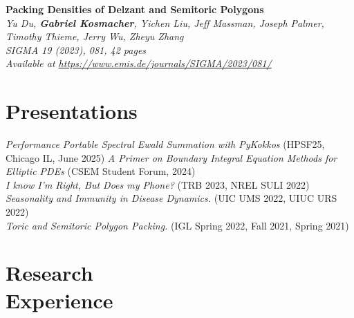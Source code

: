 \documentclass[resmargin, 10pt]{res} %
\begin{document}
\begin{resume}
\textbf{Packing Densities of Delzant and Semitoric Polygons} \\
\sl{Yu Du, \textbf{Gabriel Kosmacher}, Yichen Liu, Jeff Massman, Joseph Palmer, Timothy Thieme, Jerry Wu, Zheyu Zhang} \\
SIGMA 19 (2023), 081, 42 pages \\ Available at \href{https://www.emis.de/journals/SIGMA/2023/081/}{https://www.emis.de/journals/SIGMA/2023/081/}


\vspace{-8pt}
\section{Presentations} 

{\sl Performance Portable Spectral Ewald Summation with PyKokkos} (HPSF25, Chicago IL, June 2025)
{\sl A Primer on Boundary Integral Equation Methods for Elliptic PDEs} (CSEM Student Forum, 2024) \\
{\sl I know I'm Right, But Does my Phone?} (TRB 2023, NREL SULI 2022)\\
{\sl Seasonality and Immunity in Disease Dynamics.} (UIC UMS 2022, UIUC URS 2022) \\
{\sl Toric and Semitoric Polygon Packing.} (IGL Spring 2022, Fall 2021, Spring 2021) 

\vspace{-8pt}
\section{Research \\ Experience}


\end{resume}
\end{document}
